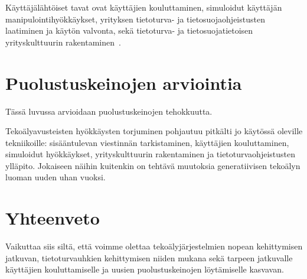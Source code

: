 \begin{otherlanguage}{finnish}
Käyttäjälähtöiset tavat ovat käyttäjien kouluttaminen, simuloidut käyttäjän manipulointihyökkäykset, yrityksen tietoturva- ja tietosuojaohjeistusten laatiminen ja käytön valvonta, sekä tietoturva- ja tietosuojatietoisen yrityskulttuurin rakentaminen~\citep{tsinganos_Towards_Automated_Recognition_Chat_SE_Enterprise_2018}.




\section*{Puolustuskeinojen arviointia}

Tässä luvussa arvioidaan puolustuskeinojen tehokkuutta.

Tekoälyavusteisten hyökkäysten torjuminen pohjautuu pitkälti jo käytössä oleville tekniikoille: sisääntulevan viestinnän tarkistaminen, käyttäjien kouluttaminen, simuloidut hyökkäykset, yrityskulttuurin rakentaminen ja tietoturvaohjeistusten ylläpito. Jokaiseen näihin kuitenkin on tehtävä muutoksia generatiivisen tekoälyn luoman uuden uhan vuoksi.


\section*{Yhteenveto}

Vaikuttaa siis siltä, että voimme olettaa tekoälyjärjestelmien nopean kehittymisen jatkuvan, tietoturvauhkien kehittymisen niiden mukana sekä tarpeen jatkuvalle käyttäjien kouluttamiselle ja uusien puolustuskeinojen löytämiselle kasvavan.





\end{otherlanguage}


